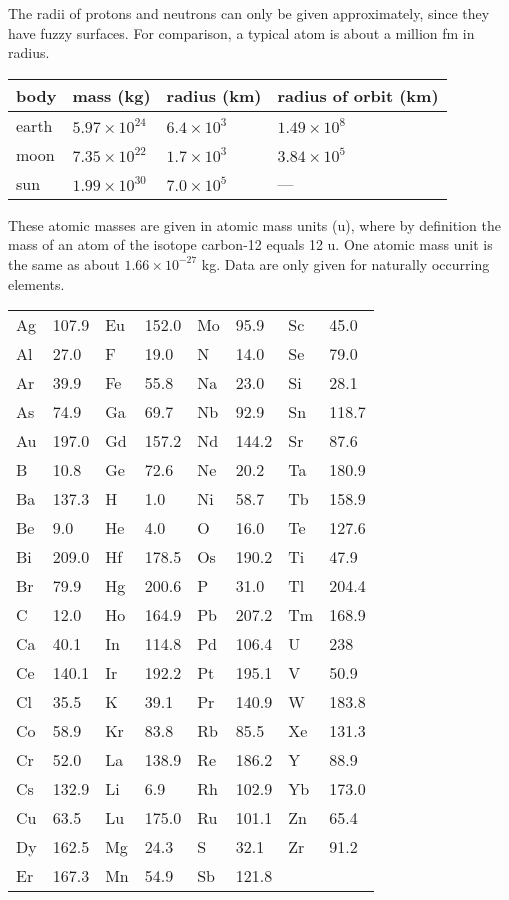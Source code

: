 \noindent{}The radii of protons and neutrons can only be given
approximately, since they have fuzzy surfaces. For
comparison, a typical atom is about a million fm in radius.




\noindent\begin{tabular}{|l|l|l|l|}
\hline
body		&	mass (kg)		&	radius (km)	&	radius of orbit (km) \\
\hline
earth	&	$5.97\times10^{24}$	&	$6.4\times10^{3}$	&	$1.49\times10^{8}$\\
moon	&	$7.35\times10^{22}$	&	$1.7\times10^{3}$	&	$3.84\times10^{5}$\\
sun		&	$1.99\times10^{30}$	&	$7.0\times10^{5}$	&	---\\
\hline
\end{tabular}


These atomic masses are given in atomic mass units (u), where by definition
the mass of an atom of the isotope carbon-12 equals 12 u. One atomic
mass unit is the same as about $1.66\times10^{-27}$ kg. Data are only
given for naturally occurring elements.

{\footnotesize
\begin{tabular}{|ll|ll|ll|ll|}
\hline
Ag	& 107.9	&Eu	& 152.0	&Mo	& 95.9	&Sc	& 45.0	\\
Al 	& 27.0 	&F	& 19.0	&N	& 14.0	&Se	& 79.0	\\
Ar 	& 39.9	&Fe	& 55.8	&Na	& 23.0	&Si	& 28.1	\\
As	& 74.9	&Ga	& 69.7	&Nb	& 92.9	&Sn	& 118.7	\\
Au	& 197.0	&Gd	& 157.2	&Nd	& 144.2	&Sr	& 87.6	\\
B	& 10.8	&Ge	& 72.6	&Ne	& 20.2	&Ta	& 180.9	\\
Ba	& 137.3	&H	& 1.0	&Ni	& 58.7	&Tb	& 158.9	\\
Be	& 9.0	&He	& 4.0	&O	& 16.0	&Te	& 127.6	\\
Bi	& 209.0	&Hf	& 178.5	&Os	& 190.2	&Ti	& 47.9	\\
Br	& 79.9	&Hg	& 200.6	&P	& 31.0	&Tl	& 204.4	\\
C	& 12.0	&Ho	& 164.9	&Pb	& 207.2	&Tm	& 168.9	\\
Ca	& 40.1	&In	& 114.8	&Pd	& 106.4	&U	& 238	\\
Ce	& 140.1	&Ir	& 192.2	&Pt	& 195.1	&V	& 50.9	\\
Cl	& 35.5	&K	& 39.1	&Pr	& 140.9	&W	& 183.8	\\
Co	& 58.9	&Kr	& 83.8	&Rb	& 85.5	&Xe	& 131.3	\\
Cr	& 52.0	&La	& 138.9	&Re	& 186.2	&Y	& 88.9	\\
Cs	& 132.9	&Li	& 6.9	&Rh	& 102.9	&Yb	& 173.0	\\
Cu	& 63.5	&Lu	& 175.0	&Ru	& 101.1	&Zn	& 65.4	\\
Dy	& 162.5	&Mg	& 24.3	&S	& 32.1	&Zr	& 91.2 	\\
Er	& 167.3	&Mn	& 54.9	&Sb 	& 121.8 	& & \\
\hline
\end{tabular}
}
